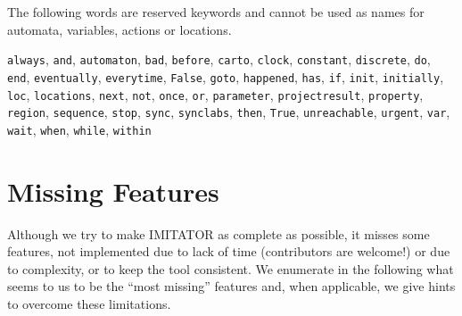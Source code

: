 \documentclass[a4paper,11pt]{report}
\makeatletter
\newcommand{\imitator}{\textsf{IMITATOR}}
\newcommand{\styleIMI}[1]{\textcolor{imicolor}{\texttt{#1}}}
\newcommand{\ie}{\textcolor{colorok}{\textit{i.e.},\@}}
\makeatother
\begin{document}
The following words are reserved keywords and cannot be used as names for automata, variables, actions or locations. 

\styleIMI{always},
\styleIMI{and},
\styleIMI{automaton},
\styleIMI{bad},
\styleIMI{before},
\styleIMI{carto},
\styleIMI{clock},
\styleIMI{constant},
\styleIMI{discrete},
\styleIMI{do},
\styleIMI{end},
\styleIMI{eventually},
\styleIMI{everytime},
\styleIMI{False},
\styleIMI{goto},
\styleIMI{happened},
\styleIMI{has},
\styleIMI{if},
\styleIMI{init},
\styleIMI{initially},
\styleIMI{loc},
\styleIMI{locations},
\styleIMI{next},
\styleIMI{not},
\styleIMI{once},
\styleIMI{or},
\styleIMI{parameter},
\styleIMI{projectresult},
\styleIMI{property},
\styleIMI{region},
\styleIMI{sequence},
\styleIMI{stop},
\styleIMI{sync},
\styleIMI{synclabs},
\styleIMI{then},
\styleIMI{True},
\styleIMI{unreachable},
\styleIMI{urgent},
\styleIMI{var},
\styleIMI{wait},
\styleIMI{when},
\styleIMI{while},
\styleIMI{within}






\chapter{Missing Features}

Although we try to make \imitator{} as complete as possible, it misses some features, not implemented due to lack of time (contributors are welcome!) or due to complexity, or to keep the tool consistent.
We enumerate in the following what seems to us to be the ``most missing'' features and, when applicable, we give hints to overcome these limitations.


% 
\end{document}
